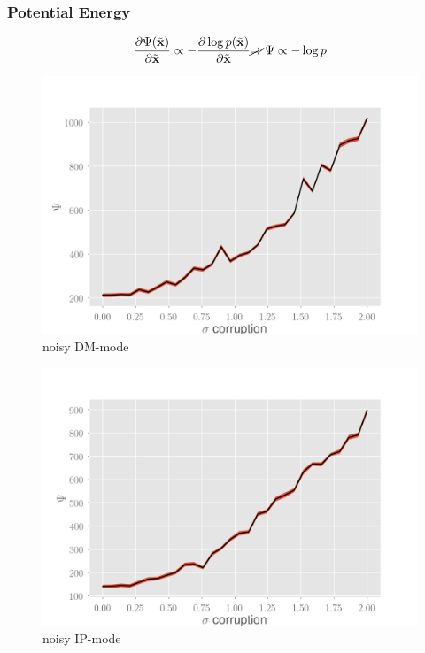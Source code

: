 \documentclass[10pt]{beamer}
\begin{document}
\begin{frame}
\frametitle{Potential Energy}
\begin{equation}
\frac{\partial \Psi(\tilde{\mathbf{x}})}{\partial \tilde{\mathbf{x}}} \propto -\frac{\partial \log p(\tilde{\mathbf{x}})}{\partial \tilde{\mathbf{x}}} \cancel{\Rightarrow}\,  \Psi \propto -\log p
\end{equation}
\begin{multicols}{2}
\begin{figure}
\centering
\includegraphics[scale=0.2]{figs/noisy-signal-dm-snr}
\caption{noisy DM-mode}
\end{figure}
\columnbreak
\begin{figure}
\centering
\includegraphics[scale=0.2]{figs/noisy-signal-ip}
\caption{noisy IP-mode}
\end{figure}
\end{multicols}
\end{frame}
\end{document}
